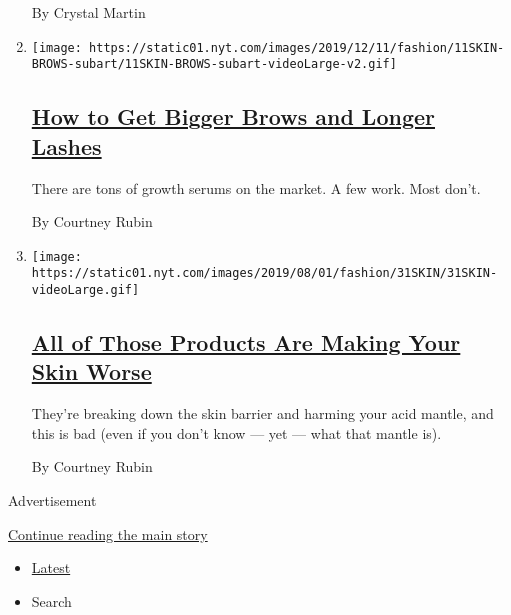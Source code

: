 \begin{enumerate}
  By Crystal Martin
\item
  \texttt{[image: https://static01.nyt.com/images/2019/12/11/fashion/11SKIN-BROWS-subart/11SKIN-BROWS-subart-videoLarge-v2.gif]}

  \hypertarget{how-to-get-bigger-brows-and-longer-lashes}{%
  \subsection{\texorpdfstring{\href{/2019/12/12/style/how-to-get-bigger-brows-and-longer-lashes.html}{How
  to Get Bigger Brows and Longer
  Lashes}}{How to Get Bigger Brows and Longer Lashes}}\label{how-to-get-bigger-brows-and-longer-lashes}}

  There are tons of growth serums on the market. A few work. Most don't.

  By Courtney Rubin
\item
  \texttt{[image: https://static01.nyt.com/images/2019/08/01/fashion/31SKIN/31SKIN-videoLarge.gif]}

  \hypertarget{all-of-those-products-are-making-your-skin-worse}{%
  \subsection{\texorpdfstring{\href{/2019/07/30/style/all-of-those-products-are-making-your-skin-worse.html}{All
  of Those Products Are Making Your Skin
  Worse}}{All of Those Products Are Making Your Skin Worse}}\label{all-of-those-products-are-making-your-skin-worse}}

  They're breaking down the skin barrier and harming your acid mantle,
  and this is bad (even if you don't know --- yet --- what that mantle
  is).

  By Courtney Rubin
\end{enumerate}

Advertisement

\protect\hyperlink{after-mid1}{Continue reading the main story}

\begin{itemize}
\tightlist
\item
  \protect\hyperlink{stream-panel}{Latest}
\item
  Search
\end{itemize}

